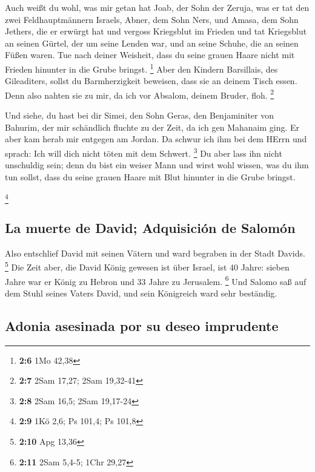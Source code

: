  Auch weißt du wohl, was mir getan hat Joab, der Sohn der
Zeruja, was er tat den zwei Feldhauptmännern Israels, Abner, dem Sohn
Ners, und Amasa, dem Sohn Jethers, die er erwürgt hat und vergoss
Kriegsblut im Frieden und tat Kriegsblut an seinen Gürtel, der um seine
Lenden war, und an seine Schuhe, die an seinen Füßen waren.
 Tue nach deiner Weisheit, dass du seine grauen Haare
nicht mit Frieden hinunter in die Grube bringst. \footnote{\textbf{2:6}
  1Mo 42,38}  Aber den Kindern Barsillais, des
Gileaditers, sollst du Barmherzigkeit beweisen, dass sie an deinem Tisch
essen. Denn also nahten sie zu mir, da ich vor Absalom, deinem Bruder,
floh. \footnote{\textbf{2:7} 2Sam 17,27; 2Sam 19,32-41}

 Und siehe, du hast bei dir Simei, den Sohn Geras, den
Benjaminiter von Bahurim, der mir schändlich fluchte zu der Zeit, da ich
gen Mahanaim ging. Er aber kam herab mir entgegen am Jordan. Da schwur
ich ihm bei dem HErrn und sprach: Ich will dich nicht töten mit dem
Schwert. \footnote{\textbf{2:8} 2Sam 16,5; 2Sam 19,17-24} 
Du aber lass ihn nicht unschuldig sein; denn du bist ein weiser Mann und
wirst wohl wissen, was du ihm tun sollst, dass du seine grauen Haare mit
Blut hinunter in die Grube bringst.

\footnote{\textbf{2:9} 1Kö 2,6; Ps 101,4; Ps 101,8}

\hypertarget{la-muerte-de-david-adquisiciuxf3n-de-salomuxf3n}{%
\subsection{La muerte de David; Adquisición de
Salomón}\label{la-muerte-de-david-adquisiciuxf3n-de-salomuxf3n}}

 Also entschlief David mit seinen Vätern und ward
begraben in der Stadt Davids. \footnote{\textbf{2:10} Apg 13,36}
 Die Zeit aber, die David König gewesen ist über Israel,
ist 40 Jahre: sieben Jahre war er König zu Hebron und 33 Jahre zu
Jerusalem. \footnote{\textbf{2:11} 2Sam 5,4-5; 1Chr 29,27}
 Und Salomo saß auf dem Stuhl seines Vaters David, und
sein Königreich ward sehr beständig.

\hypertarget{adonia-asesinada-por-su-deseo-imprudente}{%
\subsection{Adonia asesinada por su deseo
imprudente}\label{adonia-asesinada-por-su-deseo-imprudente}}

